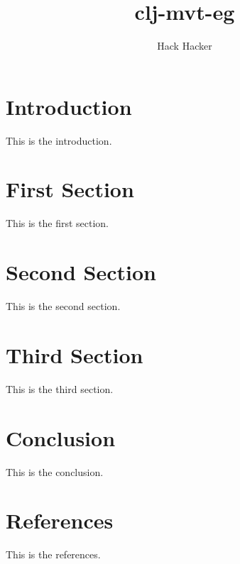 \documentclass{article}
\title{clj-mvt-eg}
\date{}
\author{Hack Hacker}
\begin{document}
\maketitle


\section*{Introduction}
\label{sec:introduction}
This is the introduction.


\section*{First Section}
\label{sec:first-section}
This is the first section.


\section*{Second Section}
\label{sec:second-section}
This is the second section.


\section*{Third Section}
\label{sec:third-section}
This is the third section.


\section*{Conclusion}
\label{sec:conclusion}
This is the conclusion.


\section*{References}
\label{sec:references}
This is the references.
\end{document}

